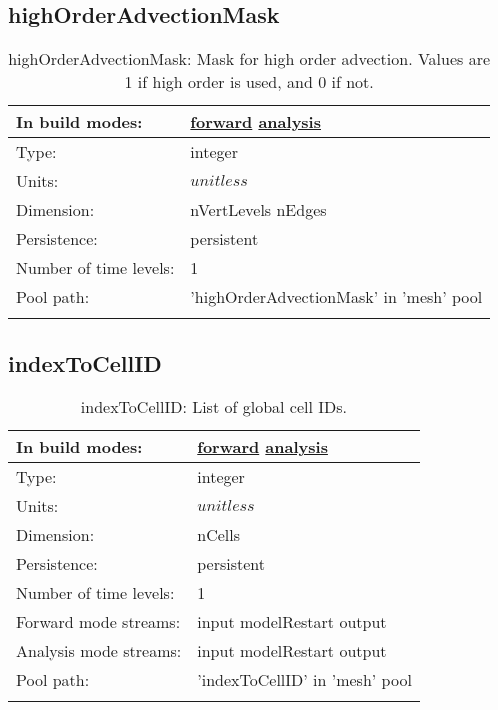 \subsection[highOrderAdvectionMask]{highOrderAdvectionMask}
\label{subsec:var_sec_mesh_highOrderAdvectionMask}
\begin{center}
\begin{longtable}{| p{2.0in} | p{4.0in} |}
        \hline 
        In build modes: & \hyperref[subsec:forward_var_tab_mesh]{forward} \hyperref[subsec:analysis_var_tab_mesh]{analysis} \\
        \hline 
        Type: & integer \\
        \hline 
        Units: & $unitless$ \\
        \hline 
        Dimension: & nVertLevels nEdges \\
        \hline 
        Persistence: & persistent \\
        \hline 
        Number of time levels: & 1 \\
        \hline 
            Pool path: & 'highOrderAdvectionMask' in 'mesh' pool
 \\
		 \hline 
    \caption{highOrderAdvectionMask: Mask for high order advection. Values are 1 if high order is used, and 0 if not.}
\end{longtable}
\end{center}
\subsection[indexToCellID]{indexToCellID}
\label{subsec:var_sec_mesh_indexToCellID}
\begin{center}
\begin{longtable}{| p{2.0in} | p{4.0in} |}
        \hline 
        In build modes: & \hyperref[subsec:forward_var_tab_mesh]{forward} \hyperref[subsec:analysis_var_tab_mesh]{analysis} \\
        \hline 
        Type: & integer \\
        \hline 
        Units: & $unitless$ \\
        \hline 
        Dimension: & nCells \\
        \hline 
        Persistence: & persistent \\
        \hline 
        Number of time levels: & 1 \\
        \hline 
		 Forward mode streams: &  input modelRestart output \\
        \hline 
		 Analysis mode streams: &  input modelRestart output \\
        \hline 
            Pool path: & 'indexToCellID' in 'mesh' pool
 \\
		 \hline 
    \caption{indexToCellID: List of global cell IDs.}
\end{longtable}
\end{center}
